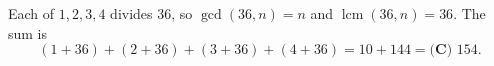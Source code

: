 Each of $1,2,3,4$ divides $36$, so $\gcd(36,n)=n$ and $\operatorname{lcm}(36,n)=36$. The sum is
\[(1+36)+(2+36)+(3+36)+(4+36)=10+144=\boxed{\textbf{(C) }154}.\]
